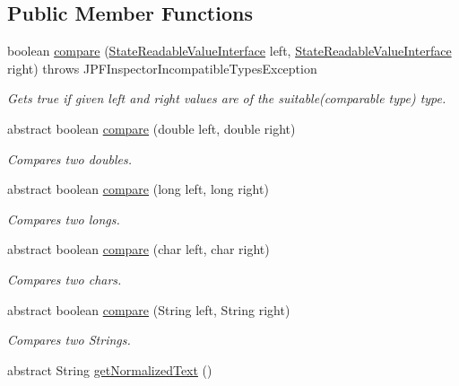 \subsection*{Public Member Functions}
\begin{DoxyCompactItemize}
\item 
boolean \hyperlink{classgov_1_1nasa_1_1jpf_1_1inspector_1_1server_1_1programstate_1_1relop_1_1_rel_op_comparable_base_a8b752e9df78b668d5b917c6285225d81}{compare} (\hyperlink{interfacegov_1_1nasa_1_1jpf_1_1inspector_1_1server_1_1programstate_1_1_state_readable_value_interface}{State\+Readable\+Value\+Interface} left, \hyperlink{interfacegov_1_1nasa_1_1jpf_1_1inspector_1_1server_1_1programstate_1_1_state_readable_value_interface}{State\+Readable\+Value\+Interface} right)  throws J\+P\+F\+Inspector\+Incompatible\+Types\+Exception 
\begin{DoxyCompactList}\small\item\em Gets true if given left and right values are of the suitable(comparable type) type. \end{DoxyCompactList}\item 
abstract boolean \hyperlink{classgov_1_1nasa_1_1jpf_1_1inspector_1_1server_1_1programstate_1_1relop_1_1_rel_op_comparable_base_aab2a521170999ae8b920a769b15d8e19}{compare} (double left, double right)
\begin{DoxyCompactList}\small\item\em Compares two doubles. \end{DoxyCompactList}\item 
abstract boolean \hyperlink{classgov_1_1nasa_1_1jpf_1_1inspector_1_1server_1_1programstate_1_1relop_1_1_rel_op_comparable_base_a0071694ee5639595860579d26a89987f}{compare} (long left, long right)
\begin{DoxyCompactList}\small\item\em Compares two longs. \end{DoxyCompactList}\item 
abstract boolean \hyperlink{classgov_1_1nasa_1_1jpf_1_1inspector_1_1server_1_1programstate_1_1relop_1_1_rel_op_comparable_base_ab0132ecf6b21cf1308ebc80cfd7c65f3}{compare} (char left, char right)
\begin{DoxyCompactList}\small\item\em Compares two chars. \end{DoxyCompactList}\item 
abstract boolean \hyperlink{classgov_1_1nasa_1_1jpf_1_1inspector_1_1server_1_1programstate_1_1relop_1_1_rel_op_comparable_base_acfeadca31aaedb7c13b375ca1053cad5}{compare} (String left, String right)
\begin{DoxyCompactList}\small\item\em Compares two Strings. \end{DoxyCompactList}\item 
abstract String \hyperlink{classgov_1_1nasa_1_1jpf_1_1inspector_1_1server_1_1programstate_1_1relop_1_1_rel_op_comparable_base_a6c344f92ac28aeca1c6f1e1840fed335}{get\+Normalized\+Text} ()
\end{DoxyCompactItemize}
